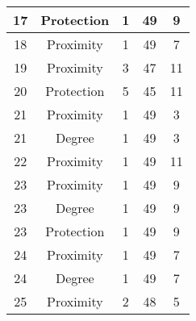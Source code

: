 \documentclass[results.tex]{subfiles}
\begin{document}
\begin{center}
\begin{tabular}{| c || c | c | c | c |}
            \hline
            17                      & Protection                   & 1                      & 49                      & 9                    \\
            \hline
            18                      & Proximity                    & 1                      & 49                      & 7                    \\
            \hline
            19                      & Proximity                    & 3                      & 47                      & 11                   \\
            \hline
            20                      & Protection                   & 5                      & 45                      & 11                   \\
            \hline
            21                      & Proximity                    & 1                      & 49                      & 3                    \\
            \hline
            21                      & Degree                       & 1                      & 49                      & 3                    \\
            \hline
            22                      & Proximity                    & 1                      & 49                      & 11                   \\
            \hline
            23                      & Proximity                    & 1                      & 49                      & 9                    \\
            \hline
            23                      & Degree                       & 1                      & 49                      & 9                    \\
            \hline
            23                      & Protection                   & 1                      & 49                      & 9                    \\
            \hline
            24                      & Proximity                    & 1                      & 49                      & 7                    \\
            \hline
            24                      & Degree                       & 1                      & 49                      & 7                    \\
            \hline
            25                      & Proximity                    & 2                      & 48                      & 5                    \\

\end{tabular}
\end{center}
\end{document}
